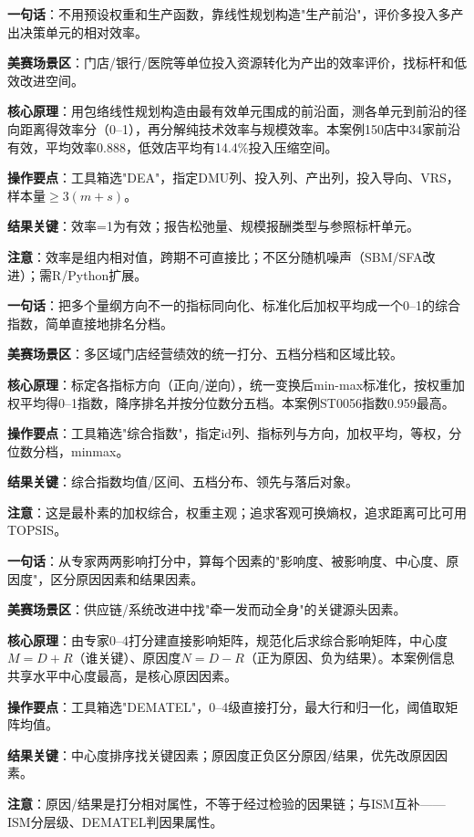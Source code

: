 \begin{algobrief}
\textbf{一句话}：不用预设权重和生产函数，靠线性规划构造"生产前沿"，评价多投入多产出决策单元的相对效率。

\textbf{美赛场景区}：门店/银行/医院等单位投入资源转化为产出的效率评价，找标杆和低效改进空间。

\textbf{核心原理}：用包络线性规划构造由最有效单元围成的前沿面，测各单元到前沿的径向距离得效率分（0--1），再分解纯技术效率与规模效率。本案例150店中34家前沿有效，平均效率0.888，低效店平均有14.4\%投入压缩空间。

\textbf{操作要点}：工具箱选"DEA"，指定DMU列、投入列、产出列，投入导向、VRS，样本量$\geq 3(m+s)$。

\textbf{结果关键}：效率=1为有效；报告松弛量、规模报酬类型与参照标杆单元。

\textbf{注意}：效率是组内相对值，跨期不可直接比；不区分随机噪声（SBM/SFA改进）；需R/Python扩展。
\end{algobrief}


\begin{algobrief}
\textbf{一句话}：把多个量纲方向不一的指标同向化、标准化后加权平均成一个0--1的综合指数，简单直接地排名分档。

\textbf{美赛场景区}：多区域门店经营绩效的统一打分、五档分档和区域比较。

\textbf{核心原理}：标定各指标方向（正向/逆向），统一变换后min-max标准化，按权重加权平均得0--1指数，降序排名并按分位数分五档。本案例ST0056指数0.959最高。

\textbf{操作要点}：工具箱选"综合指数"，指定id列、指标列与方向，加权平均，等权，分位数分档，minmax。

\textbf{结果关键}：综合指数均值/区间、五档分布、领先与落后对象。

\textbf{注意}：这是最朴素的加权综合，权重主观；追求客观可换熵权，追求距离可比可用TOPSIS。
\end{algobrief}


\begin{algobrief}
\textbf{一句话}：从专家两两影响打分中，算每个因素的"影响度、被影响度、中心度、原因度"，区分原因因素和结果因素。

\textbf{美赛场景区}：供应链/系统改进中找"牵一发而动全身"的关键源头因素。

\textbf{核心原理}：由专家0--4打分建直接影响矩阵，规范化后求综合影响矩阵，中心度$M=D+R$（谁关键）、原因度$N=D-R$（正为原因、负为结果）。本案例信息共享水平中心度最高，是核心原因因素。

\textbf{操作要点}：工具箱选"DEMATEL"，0--4级直接打分，最大行和归一化，阈值取矩阵均值。

\textbf{结果关键}：中心度排序找关键因素；原因度正负区分原因/结果，优先改原因因素。

\textbf{注意}：原因/结果是打分相对属性，不等于经过检验的因果链；与ISM互补——ISM分层级、DEMATEL判因果属性。
\end{algobrief}

